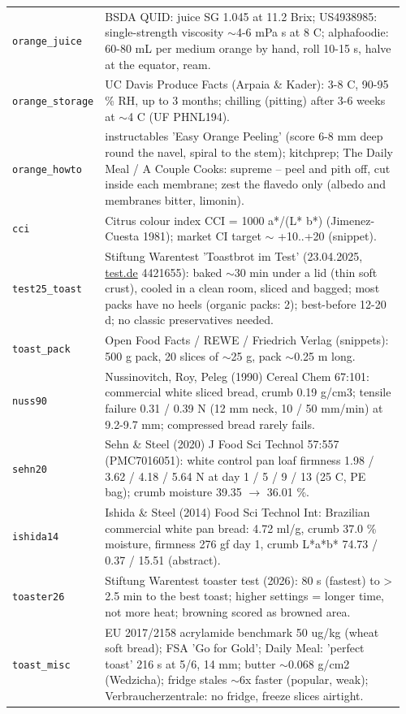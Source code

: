 \documentclass[10.5pt,a4paper]{article}
\begin{document}
{\begin{longtable}{@{}p{0.16\linewidth}p{0.8\linewidth}@{}}
\texttt{orange\_\allowbreak{}juice} & BSDA QUID: juice SG 1.045 at 11.2 Brix; US4938985: single-strength viscosity $\sim$4-6 mPa s at 8 C; alphafoodie: 60-80 mL per medium orange by hand, roll 10-15 s, halve at the equator, ream. \\
\texttt{orange\_\allowbreak{}storage} & UC Davis Produce Facts (Arpaia \& Kader): 3-8 C, 90-95 \% RH, up to 3 months; chilling (pitting) after 3-6 weeks at $\sim$4 C (UF PHNL194). \\
\texttt{orange\_\allowbreak{}howto} & instructables 'Easy Orange Peeling' (score 6-8 mm deep round the navel, spiral to the stem); kitchprep; The Daily Meal / A Couple Cooks: supreme -- peel and pith off, cut inside each membrane; zest the flavedo only (albedo and membranes bitter, limonin). \\
\texttt{cci} & Citrus colour index CCI = 1000 a*/(L* b*) (Jimenez-Cuesta 1981); market CI target $\sim$ +10..+20 (snippet). \\
\texttt{test25\_\allowbreak{}toast} & Stiftung Warentest 'Toastbrot im Test' (23.04.2025, \url{test.de} 4421655): baked $\sim$30 min under a lid (thin soft crust), cooled in a clean room, sliced and bagged; most packs have no heels (organic packs: 2); best-before 12-20 d; no classic preservatives needed. \\
\texttt{toast\_\allowbreak{}pack} & Open Food Facts / REWE / Friedrich Verlag (snippets): 500 g pack, 20 slices of $\sim$25 g, pack $\sim$0.25 m long. \\
\texttt{nuss90} & Nussinovitch, Roy, Peleg (1990) Cereal Chem 67:101: commercial white sliced bread, crumb 0.19 g/cm3; tensile failure 0.31 / 0.39 N (12 mm neck, 10 / 50 mm/min) at 9.2-9.7 mm; compressed bread rarely fails. \\
\texttt{sehn20} & Sehn \& Steel (2020) J Food Sci Technol 57:557 (PMC7016051): white control pan loaf firmness 1.98 / 3.62 / 4.18 / 5.64 N at day 1 / 5 / 9 / 13 (25 C, PE bag); crumb moisture 39.35 $\to$ 36.01 \%. \\
\texttt{ishida14} & Ishida \& Steel (2014) Food Sci Technol Int: Brazilian commercial white pan bread: 4.72 ml/g, crumb 37.0 \% moisture, firmness 276 gf day 1, crumb L*a*b* 74.73 / 0.37 / 15.51 (abstract). \\
\texttt{toaster26} & Stiftung Warentest toaster test (2026): 80 s (fastest) to > 2.5 min to the best toast; higher settings = longer time, not more heat; browning scored as browned area. \\
\texttt{toast\_\allowbreak{}misc} & EU 2017/2158 acrylamide benchmark 50 ug/kg (wheat soft bread); FSA 'Go for Gold'; Daily Meal: 'perfect toast' 216 s at 5/6, 14 mm; butter $\sim$0.068 g/cm2 (Wedzicha); fridge stales $\sim$6x faster (popular, weak); Verbraucherzentrale: no fridge, freeze slices airtight. \\

\end{longtable}}
\end{document}
